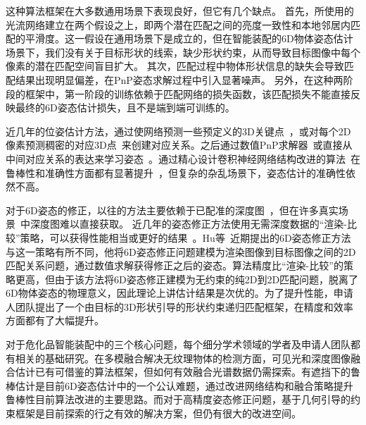\documentclass[12pt]{article}
\begin{document}
这种算法框架在大多数通用场景下表现良好，但它有几个缺点。
首先，所使用的光流网络建立在两个假设之上，即两个潜在匹配之间的亮度一致性和本地邻居内匹配的平滑度。这一假设在通用场景下是成立的，但在智能装配的6D物体姿态估计场景下，我们没有关于目标形状的线索，缺少形状约束，从而导致目标图像中每个像素的潜在匹配空间盲目扩大。
其次，匹配过程中物体形状信息的缺失会导致匹配结果出现明显偏差，在PnP姿态求解过程中引入显著噪声。
另外，在这种两阶段的框架中，第一阶段的训练依赖于匹配网络的损失函数，该匹配损失不能直接反映最终的6D姿态估计损失，且不是端到端可训练的。

近几年的位姿估计方法，通过使网络预测一些预定义的3D关键点~\cite{rad2017bb8, hu2019segDriven, peng2019pvnet, Hu2021}，或对每个2D像素预测稠密的对应3D点~\cite{zakharov2019dpod, Su2022, li2019cdpn, wang2021gdrnet, Di2021}来创建对应关系。之后通过数值PnP求解器~\cite{lepetit2009epnp}或直接从中间对应关系的表达来学习姿态~\cite{hu2020singleStage, EroPnP,wang2021gdrnet, Di2021}。通过精心设计卷积神经网络结构改进的算法~\cite{he2016resnet, resnext_2017_cvpr}在鲁棒性和准确性方面都有显著提升~\cite{Xiang2018, peng2019pvnet, wang2019densefusion60}，但复杂的杂乱场景下，姿态估计的准确性依然不高。

对于6D姿态的修正，以往的方法主要依赖于已配准的深度图~\cite{Xiang2018, li2019cdpn, wang2019densefusion60}，但在许多真实场景~\cite{Hu2021}中深度图难以直接获取。
近几年的姿态修正方法使用无需深度数据的“渲染-比较”策略，可以获得性能相当或更好的结果~\cite{li2018deepim, zakharov2019dpod, cosypose, rad2017bb8, Hu2022, Lipson2022, RNNPose_2022_cvpr,Repose_2021_iccv}。Hu等~\cite{Hu2022}近期提出的6D姿态修正方法与这一策略有所不同，他将6D姿态修正问题建模为渲染图像到目标图像之间的2D匹配关系问题，通过数值求解获得修正之后的姿态。算法精度比“渲染-比较”的策略更高，但由于该方法将6D姿态修正建模为无约束的纯2D到2D匹配问题，脱离了6D物体姿态的物理意义，因此理论上讲估计结果是次优的。为了提升性能，申请人团队提出了一个由目标的3D形状引导的形状约束递归匹配框架，在精度和效率方面都有了大幅提升\cite{?}。

对于危化品智能装配中的三个核心问题，每个细分学术领域的学者及申请人团队都有相关的基础研究。在多模融合解决无纹理物体的检测方面，可见光和深度图像融合估计已有可借鉴的算法框架，但如何有效融合光谱数据仍需探索。有遮挡下的鲁棒估计是目前6D姿态估计中的一个公认难题，通过改进网络结构和融合策略提升鲁棒性目前算法改进的主要思路。而对于高精度姿态修正问题，基于几何引导的约束框架是目前探索的行之有效的解决方案，但仍有很大的改进空间。
\end{document}
